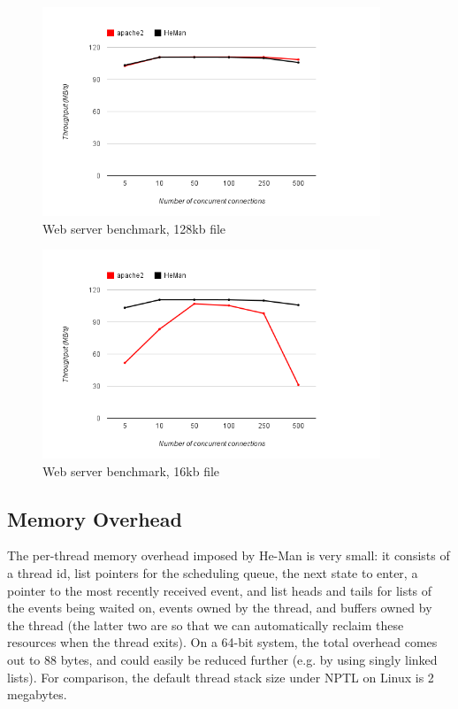 \documentclass[preprint,11pt]{sigplanconf}
\begin{document}
\begin{figure}[!htb]
	\centering
	\includegraphics[width=0.9\textwidth]{128kb_graph.png}
	\caption{Web server benchmark, 128kb file}
	\label{fig:graph128}
\end{figure}
\begin{figure}[!htb]
	\centering
	\includegraphics[width=0.9\textwidth]{16kb_graph.png}
	\caption{Web server benchmark, 16kb file}
	\label{fig:graph16}
\end{figure}


\subsection{Memory Overhead}

The per-thread memory overhead imposed by He-Man is very small: it
consists of a thread id, list pointers for the scheduling queue, the
next state to enter, a pointer to the most recently received event,
and list heads and tails for lists of the events being waited on,
events owned by the thread, and buffers owned by the thread (the
latter two are so that we can automatically reclaim these resources
when the thread exits). On a 64-bit system, the total overhead comes
out to 88 bytes, and could easily be reduced further (e.g. by using
singly linked lists).  For comparison, the default thread stack size
under NPTL on Linux is 2 megabytes.
\end{document}

